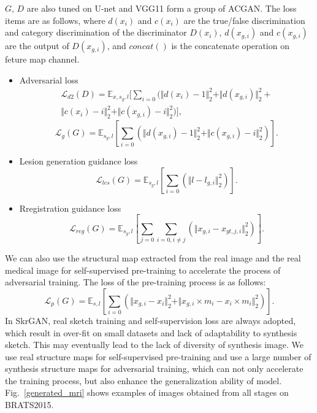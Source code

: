 \documentclass[runningheads]{llncs}
\begin{document}
	$G$, $D$ are also tuned on U-net and VGG11 form a group of ACGAN\cite{98odena2016conditional}. The loss items are as follows, where $d(x_{i})$ and $c(x_{i})$ are the true/false discrimination and category discrimination of the discriminator $D(x_i)$, $d(x_{g, i})$ and $c(x_{g,i})$ are the output of $D(x_{g,i})$, and $concat()$ is the concatenate operation on feture map channel. 
	\begin{itemize}
		\item{Adversarial loss}
		\begin{equation}
		\begin{split}
		\mathcal{L}_{d2}(D)=\mathbb{E}_{x,s_g,l}[\sum\limits_{i=0}(\Vert{d(x_i)-1}\Vert_{2}^{2}+\Vert{d(x_{g,i})}\Vert_{2}^{2}+\\
		\Vert{c(x_i)-i}\Vert_{2}^{2}+\Vert{c(x_{g,i})-i}\Vert_{2}^{2})],
		\end{split}
		\end{equation}
		\begin{equation}
		\mathcal{L}_{g}(G)=\mathbb{E}_{s_g,l}[\sum\limits_{i=0}(\Vert{d(x_{g,i})-1}\Vert_{2}^{2}+\Vert{c(x_{g,i})-i}\Vert_{2}^{2})].
		\end{equation}
		\item{Lesion generation guidance loss}
		\begin{equation}
		\mathcal{L}_{les}(G)=\mathbb{E}_{s_g,l}[\sum\limits_{i=0}(\Vert{l-l_{g,i}}\Vert_{2}^{2})].
		\end{equation}
		\item{Rregistration guidance loss}
		\begin{equation}
		\mathcal{L}_{reg}(G)=\mathbb{E}_{s_g,l}[\sum\limits_{j=0}\sum\limits_{i=0,i\neq j}(\Vert{x_{g,i}-x_{gt,j,i}}\Vert_{2}^{2})].
		\end{equation}
	\end{itemize}
	We can also use the structural map extracted from the real image and the real medical image for self-supervised pre-training to accelerate the process of adversarial training. The loss of the pre-training process is as follows:
	\begin{equation}
	\mathcal{L}_{p}(G)=\mathbb{E}_{s,l}[\sum\limits_{i=0}(\Vert{x_{g,i}-x_i}\Vert_{2}^{2}+\Vert{x_{g,i}\times m_i-x_{i}\times m_i}\Vert_{2}^{2})].
	\end{equation}
	In SkrGAN\cite{96zhang2019skrgan:}, real sketch training and self-supervision loss are always adopted, which result in over-fit on small datasets and lack of adaptability to synthesis sketch. This may eventually lead to the lack of diversity of synthesis image. We use real structure maps for self-supervised pre-training and use a large number of synthesis structure maps for adversarial training, which can not only accelerate the training process, but also enhance the generalization ability of model. Fig.~\ref{generated_mri} shows examples of images obtained from all stages on BRATS2015.
\end{document}
